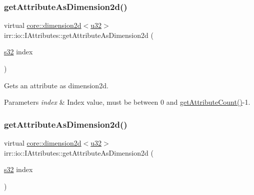 \subsubsection{\texorpdfstring{get\+Attribute\+As\+Dimension2d()}{getAttributeAsDimension2d()}\hspace{0.1cm}{\footnotesize\ttfamily [3/4]}}
{\footnotesize\ttfamily virtual \hyperlink{classirr_1_1core_1_1dimension2d}{core\+::dimension2d}$<$\hyperlink{namespaceirr_a0416a53257075833e7002efd0a18e804}{u32}$>$ irr\+::io\+::\+I\+Attributes\+::get\+Attribute\+As\+Dimension2d (\begin{DoxyParamCaption}\item[{\hyperlink{namespaceirr_ac66849b7a6ed16e30ebede579f9b47c6}{s32}}]{index }\end{DoxyParamCaption})\hspace{0.3cm}{\ttfamily [pure virtual]}}



Gets an attribute as dimension2d. 


\begin{DoxyParams}{Parameters}
{\em index} & Index value, must be between 0 and \hyperlink{classirr_1_1io_1_1IAttributes_a796bdd9440ee7ba0b6742a90a82870b6}{get\+Attribute\+Count()}-\/1. \\
\hline
\end{DoxyParams}
\mbox{\label{classirr_1_1io_1_1IAttributes_a07f89c0d3670df87242cf8b82a8c7e3f}} 
\subsubsection{\texorpdfstring{get\+Attribute\+As\+Dimension2d()}{getAttributeAsDimension2d()}\hspace{0.1cm}{\footnotesize\ttfamily [4/4]}}
{\footnotesize\ttfamily virtual \hyperlink{classirr_1_1core_1_1dimension2d}{core\+::dimension2d}$<$\hyperlink{namespaceirr_a0416a53257075833e7002efd0a18e804}{u32}$>$ irr\+::io\+::\+I\+Attributes\+::get\+Attribute\+As\+Dimension2d (\begin{DoxyParamCaption}\item[{\hyperlink{namespaceirr_ac66849b7a6ed16e30ebede579f9b47c6}{s32}}]{index }\end{DoxyParamCaption})\hspace{0.3cm}{\ttfamily [pure virtual]}}



